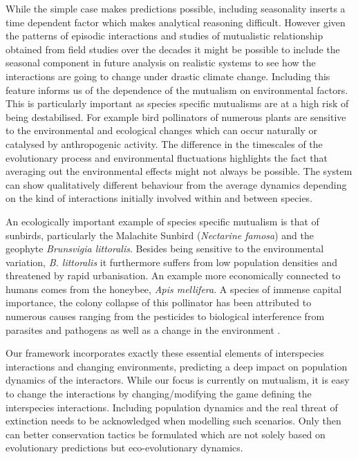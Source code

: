 \documentclass[12pt]{article}
\begin{document}
While the simple case makes predictions possible, including seasonality inserts a time dependent factor which makes analytical reasoning difficult.
However given the patterns of episodic interactions and studies of mutualistic relationship obtained from field studies over the decades it might be possible to include the seasonal component in future analysis on realistic systems to see how the interactions are going to change under drastic climate change.
Including this feature informs us of the dependence of the mutualism on environmental factors.
This is particularly important as species specific mutualisms are at a high risk of being destabilised.
For example bird pollinators of numerous plants are sensitive to the environmental and ecological changes which can occur naturally or catalysed by anthropogenic activity.
The difference in the timescales of the evolutionary process and environmental fluctuations highlights the fact that averaging out the environmental effects might not always be possible.
The system can show qualitatively different behaviour from the average dynamics depending on the kind of interactions initially involved within and between species.

An ecologically important example of species specific mutualism is that of sunbirds, particularly the Malachite Sunbird (\textit{Nectarine famosa}) and the geophyte \textit{Brunsvigia littoralis}.
Besides being sensitive to the environmental variation, \textit{B. littoralis} it furthermore suffers from low population densities \citep{geerts:SAJB:2012} and threatened by rapid urbanisation.
An example more economically connected to humans comes from the honeybee, \textit{Apis mellifera}.
A species of immense capital importance, the colony collapse of this pollinator has been attributed to numerous causes ranging from the pesticides to biological interference from parasites and pathogens as well as a change in the environment \citep{nazzi:PLosPath:2012}.

Our framework incorporates exactly these essential elements of interspecies interactions and changing environments, predicting a deep impact on population dynamics of the interactors.
While our focus is currently on mutualism, it is easy to change the interactions by changing/modifying the game defining the interspecies interactions.
Including population dynamics and the real threat of extinction needs to be acknowledged when modelling such scenarios.
Only then can better conservation tactics be formulated which are not solely based on evolutionary predictions but eco-evolutionary dynamics.
\end{document}
